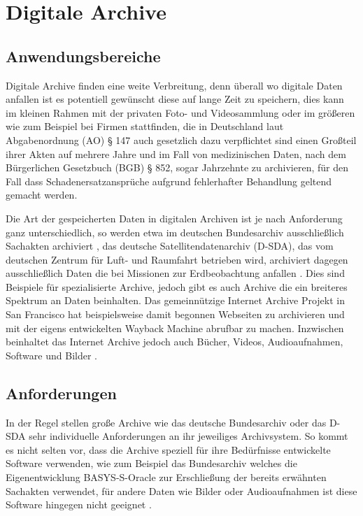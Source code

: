 \documentclass[conference,compsoc,final,a4paper]{IEEEtran}
\begin{document}
\section{Digitale Archive}

\subsection{Anwendungsbereiche}
Digitale Archive finden eine weite Verbreitung, denn überall wo digitale Daten anfallen ist es potentiell gewünscht diese auf lange Zeit zu speichern, dies kann im kleinen Rahmen mit der privaten Foto- und Videosammlung oder im größeren wie zum Beispiel bei Firmen stattfinden, die in Deutschland laut Abgabenordnung (AO) § 147 auch gesetzlich dazu verpflichtet sind einen Großteil ihrer Akten auf mehrere Jahre und im Fall von medizinischen Daten, nach dem Bürgerlichen Gesetzbuch (BGB) § 852, sogar Jahrzehnte zu archivieren, für den Fall dass Schadenersatzansprüche aufgrund fehlerhafter Behandlung geltend gemacht werden.

Die Art der gespeicherten Daten in digitalen Archiven ist je nach Anforderung ganz unterschiedlich, so werden etwa im deutschen Bundesarchiv ausschließlich Sachakten archiviert \autocite{Berger2005}, das deutsche Satellitendatenarchiv (\acs{D-SDA}), das vom deutschen Zentrum für Luft- und Raumfahrt betrieben wird, archiviert dagegen ausschließlich Daten die bei Missionen zur Erdbeobachtung anfallen \autocite{Memishi2019}. Dies sind Beispiele für spezialisierte Archive, jedoch gibt es auch Archive die ein breiteres Spektrum an Daten beinhalten. Das gemeinnützige Internet Archive Projekt in San Francisco hat beispielsweise damit begonnen Webseiten zu archivieren und mit der eigens entwickelten Wayback Machine abrufbar zu machen. Inzwischen beinhaltet das Internet Archive jedoch auch Bücher, Videos, Audioaufnahmen, Software und Bilder \autocite{AboutIA}.

\subsection{Anforderungen}
In der Regel stellen große Archive wie das deutsche Bundesarchiv oder das \acs{D-SDA} sehr individuelle Anforderungen an ihr jeweiliges Archivsystem. So kommt es nicht selten vor, dass die Archive speziell für ihre Bedürfnisse entwickelte Software verwenden, wie zum Beispiel das Bundesarchiv welches die Eigenentwicklung BASYS-S-Oracle zur Erschließung der bereits erwähnten Sachakten verwendet, für andere Daten wie Bilder oder Audioaufnahmen ist diese Software hingegen nicht geeignet \autocite{Berger2005}.
\end{document}
